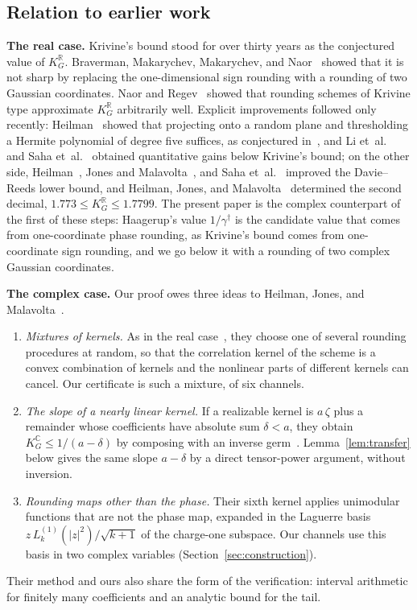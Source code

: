 \documentclass[11pt,reqno]{amsart}
\theoremstyle{definition}
\numberwithin{equation}{section}
\newcommand{\C}{\mathbb{C}}
\newcommand{\R}{\mathbb{R}}
\newcommand{\KGC}{K_G^{\C}}
\newcommand{\KGR}{K_G^{\R}}
\newcommand{\gd}{\gamma^\dagger}
\begin{document}
\subsection{Relation to earlier work}\label{sec:prior}
\textbf{The real case.} Krivine's bound stood for over thirty years as the conjectured value of $\KGR$. Braverman, Makarychev, Makarychev, and Naor~\cite{BMMN11} showed that it is not sharp by replacing the one-dimensional sign rounding with a rounding of two Gaussian coordinates. Naor and Regev~\cite{NR14} showed that rounding schemes of Krivine type approximate $\KGR$ arbitrarily well. Explicit improvements followed only recently: Heilman~\cite{Hei26} showed that projecting onto a random plane and thresholding a Hermite polynomial of degree five suffices, as conjectured in~\cite{BMMN11}, and Li et~al.~\cite{LSX26} and Saha et~al.~\cite{SLX26} obtained quantitative gains below Krivine's bound; on the other side, Heilman~\cite{Hei26b}, Jones and Malavolta~\cite{JM26}, and Saha et~al.~\cite{SLX26} improved the Davie--Reeds lower bound, and Heilman, Jones, and Malavolta~\cite{HJM26b} determined the second decimal, $1.773\le\KGR\le1.7799$. The present paper is the complex counterpart of the first of these steps: Haagerup's value $1/\gd$ is the candidate value that comes from one-coordinate phase rounding, as Krivine's bound comes from one-coordinate sign rounding, and we go below it with a rounding of two complex Gaussian coordinates.

\textbf{The complex case.} Our proof owes three ideas to Heilman, Jones, and Malavolta~\cite{HJM26}.
\begin{enumerate}
  \item \emph{Mixtures of kernels.} As in the real case~\cite{BMMN11,NR14,LSX26,SLX26}, they choose one of several rounding procedures at random, so that the correlation kernel of the scheme is a convex combination of kernels and the nonlinear parts of different kernels can cancel. Our certificate is such a mixture, of six channels.
  \item \emph{The slope of a nearly linear kernel.} If a realizable kernel is $a\,\zeta$ plus a remainder whose coefficients have absolute sum $\delta<a$, they obtain $\KGC\le 1/(a-\delta)$ by composing with an inverse germ~\cite[Lemma~3.6]{HJM26}. Lemma~\ref{lem:transfer} below gives the same slope $a-\delta$ by a direct tensor-power argument, without inversion.
  \item \emph{Rounding maps other than the phase.} Their sixth kernel applies unimodular functions that are not the phase map, expanded in the Laguerre basis $z\,L_k^{(1)}(|z|^2)/\sqrt{k+1}$ of the charge-one subspace. Our channels use this basis in two complex variables (Section~\ref{sec:construction}).
\end{enumerate}
Their method and ours also share the form of the verification: interval arithmetic for finitely many coefficients and an analytic bound for the tail.
\end{document}
